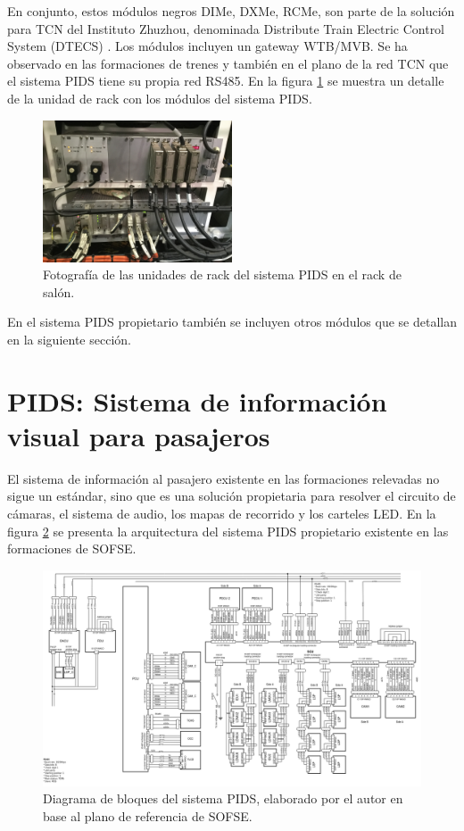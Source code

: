 En conjunto, estos módulos negros DIMe, DXMe, RCMe, son parte de la solución para TCN del Instituto Zhuzhou, denominada Distribute Train Electric Control System (DTECS)  \cite{feng2016survey}. Los módulos incluyen un gateway WTB/MVB. Se ha observado en las formaciones de trenes y también en el plano de la red TCN que el sistema PIDS tiene su propia red RS485. En la figura \ref{fig:rackPIDS1} se muestra un detalle de la unidad de rack con los módulos del sistema PIDS.\\

\begin{figure}[h!]
	\centering
	\includegraphics[width=0.5\textwidth]{./Figures/rackPIDS1.JPG}
	\caption{Fotografía de las unidades de rack del sistema PIDS en el rack de salón.}
	\label{fig:rackPIDS1}
\end{figure}

En el sistema PIDS propietario también se incluyen otros módulos que se detallan en la siguiente sección.


\section{PIDS: Sistema de información visual para pasajeros}

El sistema de información al pasajero existente en las formaciones relevadas no sigue un estándar, sino que es una solución propietaria para resolver el circuito de cámaras, el sistema de audio, los mapas de recorrido y los carteles LED. En la figura \ref{fig:diagramaPIDS} se presenta la arquitectura del sistema PIDS propietario existente en las formaciones de SOFSE.\\

\begin{figure}[h!]
	\centering
	\includegraphics[width=1.5\textwidth, angle=90]{./Figures/diagramaPIDS.png}
	\caption{Diagrama de bloques del sistema PIDS, elaborado por el autor en base al plano de referencia de SOFSE.}
	\label{fig:diagramaPIDS}
\end{figure}


